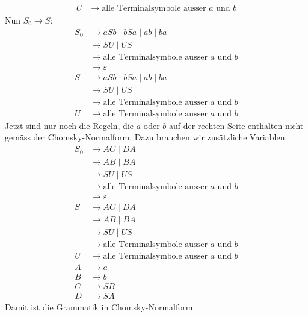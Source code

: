 \begin{loesung}
\begin{teilaufgaben}
\begin{align*}
U  &\rightarrow \text{alle Terminalsymbole ausser $a$ und $b$}
\end{align*}
Nun $S_0\rightarrow S$:
\begin{align*}
S_0&\rightarrow aSb\mid  bSa\mid ab\mid ba\\
   &\rightarrow SU \mid  US\\
   &\rightarrow \text{alle Terminalsymbole ausser $a$ und $b$}\\
   &\rightarrow \varepsilon\\
S  &\rightarrow aSb\mid  bSa\mid ab\mid ba\\
   &\rightarrow SU \mid  US\\
   &\rightarrow \text{alle Terminalsymbole ausser $a$ und $b$}\\
U  &\rightarrow \text{alle Terminalsymbole ausser $a$ und $b$}
\end{align*}
Jetzt sind nur noch die Regeln, die $a$ oder $b$ auf der rechten
Seite enthalten nicht gemäss der Chomsky-Normalform.
Dazu brauchen wir zusätzliche Variablen:
\begin{align*}
S_0&\rightarrow AC\mid  DA \\
   &\rightarrow AB\mid BA\\
   &\rightarrow SU \mid  US\\
   &\rightarrow \text{alle Terminalsymbole ausser $a$ und $b$}\\
   &\rightarrow \varepsilon\\
S  &\rightarrow AC\mid  DA \\
   &\rightarrow AB\mid BA\\
   &\rightarrow SU \mid  US\\
   &\rightarrow \text{alle Terminalsymbole ausser $a$ und $b$}\\
U  &\rightarrow \text{alle Terminalsymbole ausser $a$ und $b$}\\
A  &\rightarrow a \\
B  &\rightarrow b \\
C  &\rightarrow SB \\
D  &\rightarrow SA
\end{align*}
Damit ist die Grammatik in Chomsky-Normalform.
\qedhere
\end{teilaufgaben}
\end{loesung}

